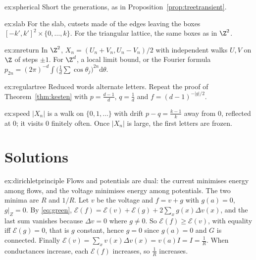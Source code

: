 \begin{hint}{ex:spherical}
Short the generations, as in Proposition~\ref{prop:treetransient}.
\end{hint}

\begin{hint}{ex:slab}
For the slab, cutsets made of the edges leaving the boxes $[-k',k']^2\times\{0,\dots,k\}$. For the triangular lattice, the same boxes as in $\Z^2$.
\end{hint}

\begin{hint}{ex:znreturn}
In $\Z^2$, $X_n=(U_n+V_n,U_n-V_n)/2$ with independent walks $U,V$ on $\Z$ of steps $\pm1$. For $\Z^d$, a local limit bound, or the Fourier formula $p_{2n}=(2\pi)^{-d}\int\bigl(\frac1d\sum\cos\theta_j\bigr)^{2n}\mathrm d\theta$.
\end{hint}

\begin{hint}{ex:regulartree}
Reduced words alternate letters. Repeat the proof of Theorem~\ref{thm:kesten} with $p=\frac{d-1}d$, $q=\frac1d$ and $f=(d-1)^{-|g|/2}$.
\end{hint}

\begin{hint}{ex:speed}
$|X_n|$ is a walk on $\{0,1,\dots\}$ with drift $p-q=\frac{k-1}k$ away from $0$, reflected at $0$; it visits $0$ finitely often. Once $|X_n|$ is large, the first letters are frozen.
\end{hint}

\section{Solutions}

\begin{solution}{ex:dirichletprinciple}
\idea Flows and potentials are dual: the current minimises energy among flows, and the voltage minimises energy among potentials. The two minima are $R$ and $1/R$.
\writeup Let $v$ be the voltage and $f=v+g$ with $g(a)=0$, $g|_Z=0$. By \eqref{eq:green}, $\mathcal E(f)=\mathcal E(v)+\mathcal E(g)+2\sum_xg(x)\Delta v(x)$, and the last sum vanishes because $\Delta v=0$ where $g\ne0$. So
$\mathcal E(f)\ge\mathcal E(v)$, with equality iff $\mathcal E(g)=0$, that is $g$ constant, hence $g=0$ since $g(a)=0$ and $G$ is connected. Finally $\mathcal E(v)=\sum_xv(x)\Delta v(x)=v(a)I=I=\frac1R$. When conductances increase, each $\mathcal E(f)$
increases, so $\frac1R$ increases.
\end{solution}

